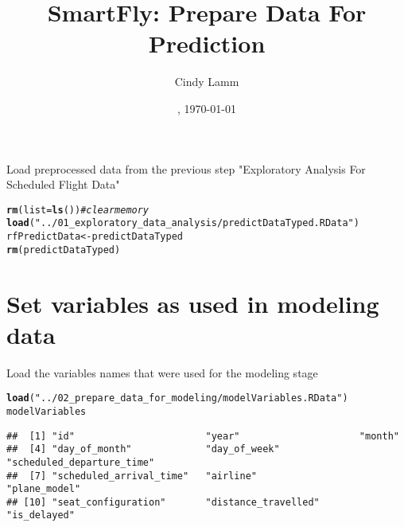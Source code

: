 \documentclass{article}\usepackage[]{graphicx}\usepackage[]{color}
\makeatletter
\newcommand{\hlstr}[1]{\textcolor[rgb]{0.192,0.494,0.8}{#1}}%
\newcommand{\hlcom}[1]{\textcolor[rgb]{0.678,0.584,0.686}{\textit{#1}}}%
\newcommand{\hlstd}[1]{\textcolor[rgb]{0.345,0.345,0.345}{#1}}%
\newcommand{\hlkwb}[1]{\textcolor[rgb]{0.69,0.353,0.396}{#1}}%
\newcommand{\hlkwc}[1]{\textcolor[rgb]{0.333,0.667,0.333}{#1}}%
\newcommand{\hlkwd}[1]{\textcolor[rgb]{0.737,0.353,0.396}{\textbf{#1}}}%
\newenvironment{kframe}{%
 \def\at@end@of@kframe{}%
 \ifinner\ifhmode%
  \def\at@end@of@kframe{\end{minipage}}%
  \begin{minipage}{\columnwidth}%
 \fi\fi%
 \def\FrameCommand##1{\hskip\@totalleftmargin \hskip-\fboxsep
 \colorbox{shadecolor}{##1}\hskip-\fboxsep
     \hskip-\linewidth \hskip-\@totalleftmargin \hskip\columnwidth}%
 \MakeFramed {\advance\hsize-\width
   \@totalleftmargin\z@ \linewidth\hsize
   \@setminipage}}%
 {\par\unskip\endMakeFramed%
 \at@end@of@kframe}
\newenvironment{knitrout}{}{} %
\makeatother
\begin{document}
\date{\currenttime, \today}
\title{SmartFly: Prepare Data For Prediction}
\author{Cindy Lamm}

\maketitle

Load preprocessed data from the previous step "Exploratory Analysis For Scheduled Flight Data"
\begin{knitrout}
\color{fgcolor}\begin{kframe}
\begin{alltt}
\hlkwd{rm}\hlstd{(}\hlkwc{list}\hlstd{=}\hlkwd{ls}\hlstd{())}   \hlcom{#clear memory}
\hlkwd{load}\hlstd{(}\hlstr{"../01_exploratory_data_analysis/predictDataTyped.RData"}\hlstd{)}
\hlstd{rfPredictData} \hlkwb{<-} \hlstd{predictDataTyped}
\hlkwd{rm}\hlstd{(predictDataTyped)}
\end{alltt}
\end{kframe}
\end{knitrout}

\section{Set variables as used in modeling data}

Load the variables names that were used for the modeling stage
\begin{knitrout}
\color{fgcolor}\begin{kframe}
\begin{alltt}
\hlkwd{load}\hlstd{(}\hlstr{"../02_prepare_data_for_modeling/modelVariables.RData"}\hlstd{)}
\hlstd{modelVariables}
\end{alltt}
\begin{verbatim}
##  [1] "id"                       "year"                     "month"                   
##  [4] "day_of_month"             "day_of_week"              "scheduled_departure_time"
##  [7] "scheduled_arrival_time"   "airline"                  "plane_model"             
## [10] "seat_configuration"       "distance_travelled"       "is_delayed"
\end{verbatim}
\end{kframe}
\end{knitrout}
\end{document}
